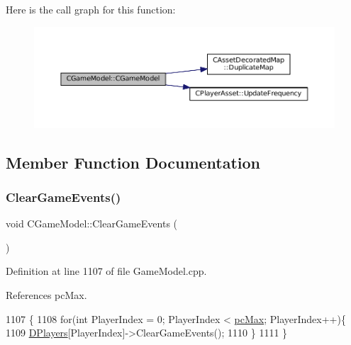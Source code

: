 Here is the call graph for this function\+:\nopagebreak
\begin{figure}[H]
\begin{center}
\leavevmode
\includegraphics[width=350pt]{classCGameModel_a37858821d1294b21b374cf4f81052f3e_cgraph}
\end{center}
\end{figure}


\subsection{Member Function Documentation}
\hypertarget{classCGameModel_a7591a4e79f91a048462bce532fd4eca1}{}\label{classCGameModel_a7591a4e79f91a048462bce532fd4eca1} 
\subsubsection{\texorpdfstring{Clear\+Game\+Events()}{ClearGameEvents()}}
{\footnotesize\ttfamily void C\+Game\+Model\+::\+Clear\+Game\+Events (\begin{DoxyParamCaption}{ }\end{DoxyParamCaption})}



Definition at line 1107 of file Game\+Model.\+cpp.



References pc\+Max.


\begin{DoxyCode}
1107                                 \{
1108     \textcolor{keywordflow}{for}(\textcolor{keywordtype}{int} PlayerIndex = 0; PlayerIndex < \hyperlink{GameDataTypes_8h_aafb0ca75933357ff28a6d7efbdd7602fa594a5c8dd3987f24e8a0f23f1a72cd34}{pcMax}; PlayerIndex++)\{
1109         \hyperlink{classCGameModel_a524436c3560b10e1c6d6fdd0b66565dc}{DPlayers}[PlayerIndex]->ClearGameEvents();
1110     \}
1111 \}
\end{DoxyCode}
\hypertarget{classCGameModel_af27947dce7cc0fa2dc9ec81872e26264}{}\label{classCGameModel_af27947dce7cc0fa2dc9ec81872e26264} 
